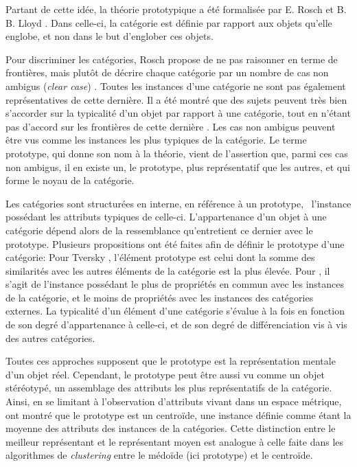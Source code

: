 Partant de cette idée, la théorie prototypique a été formalisée par E. Rosch et B. B. Lloyd \citep{rosch1978cognition}. Dans celle-ci, la catégorie est définie par rapport aux objets qu'elle englobe, et non dans le but d'englober ces objets.

Pour discriminer les catégories, Rosch propose de ne pas raisonner en terme de frontières, mais plutôt de décrire chaque catégorie par un nombre de cas non ambigus (\emph{clear case}) \citep[p. 36]{rosch1978cognition}. Toutes les instances d'une catégorie ne sont pas également représentatives de cette dernière. Il a été montré que des sujets peuvent très bien s'accorder sur la typicalité d'un objet par rapport à une catégorie, tout en n'étant pas d'accord sur les frontières de cette dernière \citep{rosch1974human,rosch1975cognitive}. Les cas non ambigus peuvent être vus comme les instances les plus typiques de la catégorie. Le terme prototype, qui donne son nom à la théorie, vient de l'assertion que, parmi ces cas non ambigus, il en existe un, le prototype, plus représentatif que les autres, et qui forme le noyau de la catégorie.

Les catégories sont structurées en interne, en référence à un prototype, \ie~l'instance possédant les attributs typiques de celle-ci. L'appartenance d'un objet à une catégorie dépend alors de la ressemblance qu'entretient ce dernier avec le prototype.  Plusieurs propositions ont été faites afin de définir le prototype d'une catégorie: Pour Tversky \citep{tversky1977features}, l'élément prototype est celui dont la somme des similarités avec les autres éléments de la catégorie est la plus élevée. Pour \citep{rosch1975family}, il s'agit de l'instance possédant le plus de propriétés en commun avec les instances de la catégorie, et le moins de propriétés avec les instances des catégories externes. La typicalité d'un élément d'une catégorie s'évalue à la fois en fonction de son degré d'appartenance à celle-ci, et de son degré de différenciation vis à vis des autres catégories. 

Toutes ces approches supposent que le prototype est la représentation mentale d'un objet réel. Cependant, le prototype peut être aussi vu comme un objet stéréotypé, un assemblage des attributs les plus représentatifs de la catégorie. Ainsi, en se limitant à l'observation d'attributs vivant dans un espace métrique, \citep{reed1972pattern, rosch1976structural} ont montré que le prototype est un centroïde, une instance définie comme étant la moyenne des attributs des instances de la catégories. Cette distinction entre le meilleur représentant et le représentant moyen est analogue à celle faite dans les algorithmes de \emph{clustering} entre le médoïde (ici prototype) et le centroïde.

